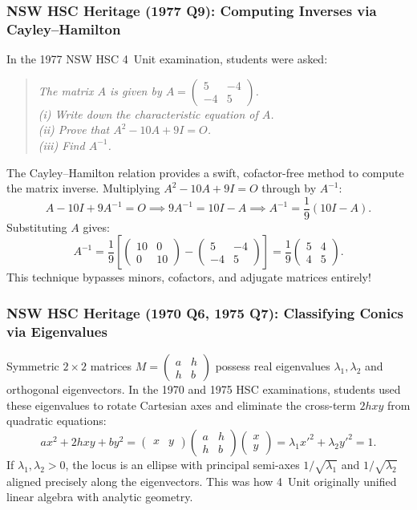 \subsubsection*{NSW HSC Heritage (1977 Q9): Computing Inverses via Cayley--Hamilton}
In the 1977 NSW HSC 4~Unit examination, students were asked:
\begin{quote}
\emph{The matrix $A$ is given by $A = \begin{pmatrix} 5 & -4 \\ -4 & 5 \end{pmatrix}$.\\
(i) Write down the characteristic equation of $A$.\\
(ii) Prove that $A^2 - 10A + 9I = O$.\\
(iii) Find $A^{-1}$.}
\end{quote}
The Cayley--Hamilton relation provides a swift, cofactor-free method to compute the matrix inverse. Multiplying $A^2 - 10A + 9I = O$ through by $A^{-1}$:
\[
A - 10I + 9A^{-1} = O \implies 9A^{-1} = 10I - A \implies A^{-1} = \frac{1}{9}(10I - A).
\]
Substituting $A$ gives:
\[
A^{-1} = \frac{1}{9} \left[ \begin{pmatrix} 10 & 0 \\ 0 & 10 \end{pmatrix} - \begin{pmatrix} 5 & -4 \\ -4 & 5 \end{pmatrix} \right] = \frac{1}{9} \begin{pmatrix} 5 & 4 \\ 4 & 5 \end{pmatrix}.
\]
This technique bypasses minors, cofactors, and adjugate matrices entirely!

\subsubsection*{NSW HSC Heritage (1970 Q6, 1975 Q7): Classifying Conics via Eigenvalues}
Symmetric $2 \times 2$ matrices $M = \begin{pmatrix} a & h \\ h & b \end{pmatrix}$ possess real eigenvalues $\lambda_1, \lambda_2$ and orthogonal eigenvectors. In the 1970 and 1975 HSC examinations, students used these eigenvalues to rotate Cartesian axes and eliminate the cross-term $2hxy$ from quadratic equations:
\[
ax^2 + 2hxy + by^2 = \begin{pmatrix} x & y \end{pmatrix} \begin{pmatrix} a & h \\ h & b \end{pmatrix} \begin{pmatrix} x \\ y \end{pmatrix} = \lambda_1 {x'}^2 + \lambda_2 {y'}^2 = 1.
\]
If $\lambda_1, \lambda_2 > 0$, the locus is an ellipse with principal semi-axes $1/\sqrt{\lambda_1}$ and $1/\sqrt{\lambda_2}$ aligned precisely along the eigenvectors. This was how 4~Unit originally unified linear algebra with analytic geometry.
